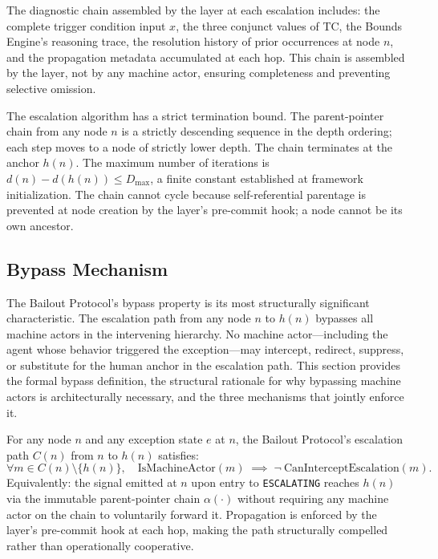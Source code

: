 The diagnostic chain assembled by the \fact{} layer at each escalation includes: the complete trigger condition input $x$, the three conjunct values of TC, the Bounds Engine's reasoning trace, the resolution history of prior occurrences at node $n$, and the propagation metadata accumulated at each hop. This chain is assembled by the \fact{} layer, not by any machine actor, ensuring completeness and preventing selective omission.

The escalation algorithm has a strict termination bound. The parent-pointer chain from any node $n$ is a strictly descending sequence in the depth ordering; each step moves to a node of strictly lower depth. The chain terminates at the anchor $h(n)$. The maximum number of iterations is $d(n) - d(h(n)) \leq D_{\max}$, a finite constant established at framework initialization. The chain cannot cycle because self-referential parentage is prevented at node creation by the \fact{} layer's pre-commit hook; a node cannot be its own ancestor.

\subsection{Bypass Mechanism}
\label{sec:bp-bypass}

The Bailout Protocol's bypass property is its most structurally significant characteristic. The escalation path from any node $n$ to $h(n)$ bypasses all machine actors in the intervening hierarchy. No machine actor---including the agent whose behavior triggered the exception---may intercept, redirect, suppress, or substitute for the human anchor in the escalation path. This section provides the formal bypass definition, the structural rationale for why bypassing machine actors is architecturally necessary, and the three mechanisms that jointly enforce it.

\begin{definition}
\label{def:bypass}
For any node $n$ and any exception state $e$ at $n$, the Bailout Protocol's escalation path $C(n)$ from $n$ to $h(n)$ satisfies:
\begin{equation}
\forall m \in C(n) \setminus \{h(n)\},\quad
\text{IsMachineActor}(m) \; \implies\; \neg\ \text{CanInterceptEscalation}(m).
\tag{BP-1}
\end{equation}
Equivalently: the signal emitted at $n$ upon entry to \texttt{ESCALATING} reaches $h(n)$ via the immutable parent-pointer chain $\alpha(\cdot)$ without requiring any machine actor on the chain to voluntarily forward it. Propagation is enforced by the \fact{} layer's pre-commit hook at each hop, making the path structurally compelled rather than operationally cooperative.
\end{definition}

